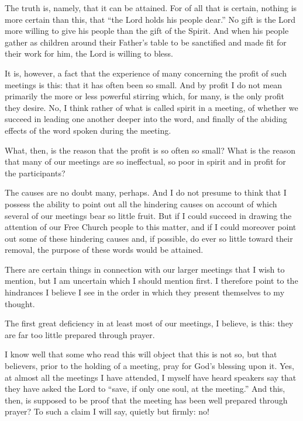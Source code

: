 The truth is, namely, that it can be attained. For of all that is certain, nothing is more certain than this, that “the Lord holds his people dear.” No gift is the Lord more willing to give his people than the gift of the Spirit. And when his people gather as children around their Father’s table to be sanctified and made fit for their work for him, the Lord is willing to bless.

It is, however, a fact that the experience of many concerning the profit of such meetings is this: that it has often been so small. And by profit I do not mean primarily the more or less powerful stirring which, for many, is the only profit they desire. No, I think rather of what is called spirit in a meeting, of whether we succeed in leading one another deeper into the word, and finally of the abiding effects of the word spoken during the meeting.

What, then, is the reason that the profit is so often so small? What is the reason that many of our meetings are so ineffectual, so poor in spirit and in profit for the participants?

The causes are no doubt many, perhaps. And I do not presume to think that I possess the ability to point out all the hindering causes on account of which several of our meetings bear so little fruit. But if I could succeed in drawing the attention of our Free Church people to this matter, and if I could moreover point out some of these hindering causes and, if possible, do ever so little toward their removal, the purpose of these words would be attained.

There are certain things in connection with our larger meetings that I wish to mention, but I am uncertain which I should mention first. I therefore point to the hindrances I believe I see in the order in which they present themselves to my thought.

The first great deficiency in at least most of our meetings, I believe, is this: they are far too little prepared through prayer.

I know well that some who read this will object that this is not so, but that believers, prior to the holding of a meeting, pray for God’s blessing upon it. Yes, at almost all the meetings I have attended, I myself have heard speakers say that they have asked the Lord to “save, if only one soul, at the meeting.” And this, then, is supposed to be proof that the meeting has been well prepared through prayer? To such a claim I will say, quietly but firmly: no!

